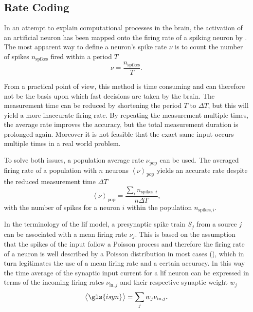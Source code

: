 \subsection{Rate Coding}
\label{ratecoding}
In an attempt to explain computational processes in the brain, the activation of an artificial neuron has been mapped onto the firing rate of a spiking neuron by \citealp{rieke1999spikes}. The most apparent way to define a neuron's spike rate $\nu$ is to count the number of spikes $n_\text{spikes}$ fired within a period $T$
\begin{equation*}
\nu = \frac{n_\text{spikes}}{T}.
\label{eqratecoding}
\end{equation*}


From a practical point of view, this method is time consuming and can therefore not be the basis upon which fast decisions are taken by the brain. The measurement time can be reduced by shortening the period $T$ to $\Delta T$, but this will yield a more inaccurate firing rate. By repeating the measurement multiple times, the average rate improves the accuracy, but the total measurement duration is prolonged again. Moreover it is not feasible that the exact same input occurs multiple times in a real world problem.

To solve both issues, a population average rate $\nu_\text{pop}$ can be used. The averaged firing rate of a population with $n$ neurons $\left\langle\nu \right\rangle_\text{pop}$ yields an accurate rate despite the reduced measurement time $\Delta T$
\begin{equation*}
\left\langle\nu \right\rangle_\text{pop} = \frac{\sum_i n_{\text{spikes},i}}{n \Delta T},
\end{equation*}
with the number of spikes for a neuron $i$ within the population $n_{\text{spikes}, i}$.

In the terminology of the \gls{lif} model, a presynaptic spike train $S_j$ from a source $j$ can be associated with a mean firing rate $\nu_j$. This is based on the assumption that the spikes of the input follow a Poisson process and therefore the firing rate of a neuron is well described by a Poisson distribution in most cases (\citealp{averbeck2009poisson}), which in turn legitimates the use of a mean firing rate and a certain accuracy. In this way the time average of the synaptic input current for a \gls{lif} neuron can be expressed in terms of the incoming firing rates $\nu_{\text{in}, j}$ and their respective synaptic weight $w_j$
\begin{equation*}
\left\langle \gls{isyn} \right\rangle = \sum_j w_j \nu_{\text{in}, j}.
\end{equation*}

